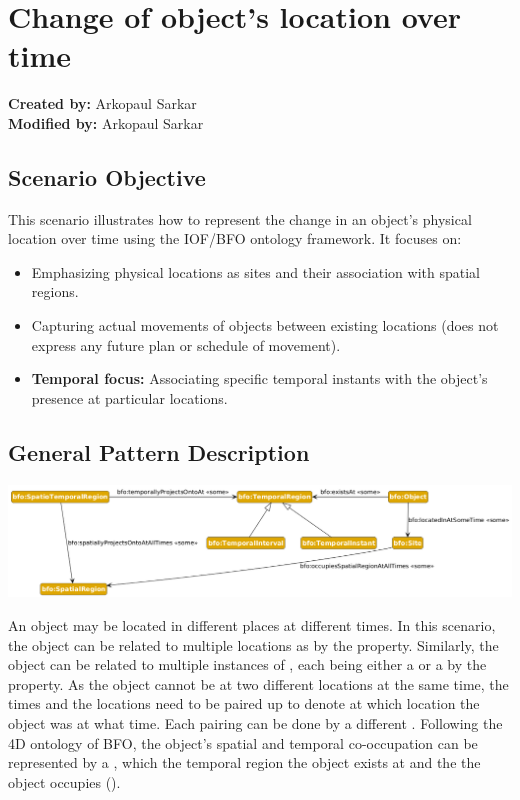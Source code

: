 \section{Change of object's location over time}
\label{sec-change-location}

\textbf{Created by:} Arkopaul Sarkar \\
\textbf{Modified by:} Arkopaul Sarkar \\

\subsection*{Scenario Objective}

This scenario illustrates how to represent the change in an object's physical location over time using the IOF/BFO ontology framework. It focuses on:
\begin{itemize}
    \item Emphasizing physical locations as sites and their association with spatial regions.
    \item Capturing actual movements of objects between existing locations (does not express any future plan or schedule of movement).
    \item \textbf{Temporal focus:} Associating specific temporal instants with the object's presence at particular locations.
\end{itemize}

\subsection*{General Pattern Description}
\includegraphics[scale=0.38]{scenarios/location-change/images/change-of-location-general.png}

An object may be located in different places at different times. In this scenario, the object can be related to multiple locations as  by the  property. Similarly, the object can be related to multiple instances of , each being either a  or a  by the  property. As the object cannot be at two different locations at the same time, the times and the locations need to be paired up to denote at which location the object was at what time. Each pairing can be done by a different . Following the 4D ontology of BFO, the object's spatial and temporal co-occupation can be represented by a , which  the temporal region the object exists at and  the  the object occupies (). 

